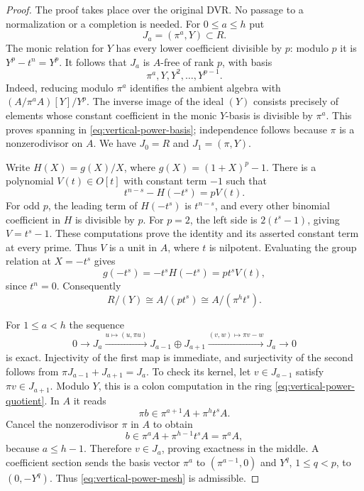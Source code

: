 \begin{proof}
The proof takes place over the original DVR.  No passage to a
normalization or a completion is needed.  For $0\leq a\leq h$ put
\[
 J_a=(\pi^a,Y)\subset R.
\]
The monic relation for $Y$ has every lower coefficient divisible by
$p$: modulo $p$ it is $Y^p-t^n=Y^p$.  It follows that $J_a$ is
$A$-free of rank $p$, with basis
\begin{equation}\label{eq:vertical-power-basis}
 \pi^a,Y,Y^2,\ldots,Y^{p-1}.
\end{equation}
Indeed, reducing modulo $\pi^a$ identifies the ambient algebra
with $(A/\pi^aA)[Y]/Y^p$.  The inverse image of the ideal $(Y)$
consists precisely of elements whose constant coefficient in the
monic $Y$-basis is divisible by $\pi^a$.  This proves spanning in
\eqref{eq:vertical-power-basis}; independence follows because
$\pi$ is a nonzerodivisor on $A$.  We have $J_0=R$ and
$J_1=(\pi,Y)$.

Write $H(X)=g(X)/X$, where $g(X)=(1+X)^p-1$.  There is a polynomial
$V(t)\in O[t]$ with constant term $-1$ such that
\begin{equation}\label{eq:vertical-parameter-unit}
 t^{n-s}-H(-t^s)=pV(t).
\end{equation}
For odd $p$, the leading term of $H(-t^s)$ is $t^{n-s}$,
and every other binomial coefficient in $H$ is divisible by $p$.
For $p=2$, the left side is $2(t^s-1)$, giving $V=t^s-1$.
These computations prove the identity and its asserted constant
term at every prime.  Thus $V$ is a unit in $A$, where $t$ is
nilpotent.  Evaluating the group relation at $X=-t^s$ gives
\[
 g(-t^s)=-t^sH(-t^s)=p t^sV(t),
\]
since $t^n=0$.  Consequently
\begin{equation}\label{eq:vertical-power-quotient}
 R/(Y)\cong A/(p t^s)\cong A/(\pi^h t^s).
\end{equation}

For $1\leq a<h$ the sequence
\begin{equation}\label{eq:vertical-power-mesh}
 0\longrightarrow J_a
 \xrightarrow{u\mapsto(u,\pi u)}J_{a-1}\oplus J_{a+1}
 \xrightarrow{(v,w)\mapsto\pi v-w}J_a
 \longrightarrow0
\end{equation}
is exact.  Injectivity of the first map is immediate, and
surjectivity of the second follows from
$\pi J_{a-1}+J_{a+1}=J_a$.  To check its kernel, let
$v\in J_{a-1}$ satisfy $\pi v\in J_{a+1}$.  Modulo $Y$,
this is a colon computation in the ring
\eqref{eq:vertical-power-quotient}.  In $A$ it reads
\[
 \pi b\in\pi^{a+1}A+\pi^h t^sA.
\]
Cancel the nonzerodivisor $\pi$ in $A$ to obtain
\[
 b\in\pi^aA+\pi^{h-1}t^sA=\pi^aA,
\]
because $a\leq h-1$.  Therefore $v\in J_a$, proving exactness
in the middle.  A coefficient section sends the basis vector
$\pi^a$ to $(\pi^{a-1},0)$ and $Y^q$, $1\leq q<p$, to
$(0,-Y^q)$.  Thus \eqref{eq:vertical-power-mesh} is admissible.


\end{proof}
